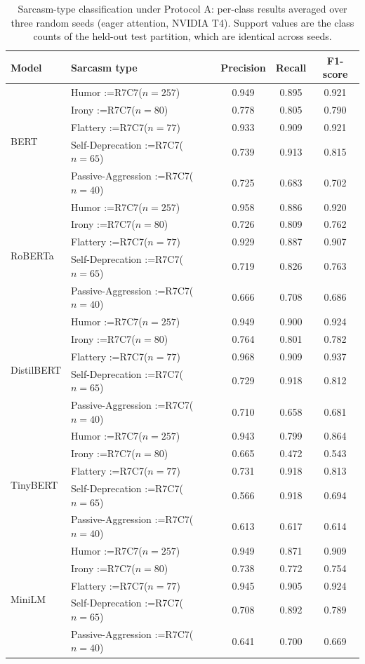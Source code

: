 \documentclass[a4paper,fleqn]{cas-sc}
\makeatletter
\newif\iftracked
\newcommand{\rv@setcolour}[1]{%
  \IfStrEq{#1}{R7C7}{\color{rvEdit}}{%
    \IfSubStr{#1}{R5}{\IfSubStr{#1}{R7}{\color{rvBoth}}{\color{rvFive}}}{\color{rvSeven}}}}
\newcommand{\rv@tag}[1]{\textsuperscript{\sffamily\bfseries\scriptsize[\StrSubstitute{#1}{,}{, }]}\,}
\newcommand{\rv@recordone}[1]{%
  \edef\rv@i{#1}%
  \ifcsdef{rv@n@\rv@i}{}{\csgdef{rv@n@\rv@i}{0}}%
  \csxdef{rv@n@\rv@i}{\the\numexpr\csuse{rv@n@\rv@i}+1\relax}%
  \begingroup\edef\@currentlabel{\rv@i}\label{rv:\rv@i:\csuse{rv@n@\rv@i}}\endgroup}
\newcommand{\rv@record}[1]{\@for\rv@id:=#1\do{\expandafter\rv@recordone\expandafter{\rv@id}}}
\DeclareRobustCommand{\rcx}[2]{\iftracked{\rv@setcolour{#1}\rv@tag{#1}#2}\else#2\fi}
\DeclareRobustCommand{\rce}[1]{\rv@record{R7C7}\iftracked{\color{rvEdit}#1}\else#1\fi}
\makeatother
\begin{document}
\begin{table}[t]
\caption{Sarcasm-type classification\rcx{R5C9,R7C2}{ under Protocol A}: per-class results averaged over three random seeds (\rcx{R7C7}{eager} attention, NVIDIA T4). Support values are the \rcx{R7C7}{class counts of the held-out test partition, which are identical across seeds}.}
\label{tab:type-perclass}
\centering\small
\begin{tabular}{llccc}
\toprule
Model & Sarcasm type & Precision & Recall & F1-score \\
\midrule
\multirow{5}{*}{BERT} & Humor \rce{($n=257$)} & 0.949 & 0.895 & 0.921 \\
 & Irony \rce{($n=80$)} & 0.778 & 0.805 & 0.790 \\
 & Flattery \rce{($n=77$)} & 0.933 & 0.909 & 0.921 \\
 & Self-Deprecation \rce{($n=65$)} & 0.739 & 0.913 & 0.815 \\
 & Passive-Aggression \rce{($n=40$)} & 0.725 & 0.683 & 0.702 \\
\midrule
\multirow{5}{*}{RoBERTa} & Humor \rce{($n=257$)} & 0.958 & 0.886 & 0.920 \\
 & Irony \rce{($n=80$)} & 0.726 & 0.809 & 0.762 \\
 & Flattery \rce{($n=77$)} & 0.929 & 0.887 & 0.907 \\
 & Self-Deprecation \rce{($n=65$)} & 0.719 & 0.826 & 0.763 \\
 & Passive-Aggression \rce{($n=40$)} & 0.666 & 0.708 & 0.686 \\
\midrule
\multirow{5}{*}{DistilBERT} & Humor \rce{($n=257$)} & 0.949 & 0.900 & 0.924 \\
 & Irony \rce{($n=80$)} & 0.764 & 0.801 & 0.782 \\
 & Flattery \rce{($n=77$)} & 0.968 & 0.909 & 0.937 \\
 & Self-Deprecation \rce{($n=65$)} & 0.729 & 0.918 & 0.812 \\
 & Passive-Aggression \rce{($n=40$)} & 0.710 & 0.658 & 0.681 \\
\midrule
\multirow{5}{*}{TinyBERT} & Humor \rce{($n=257$)} & 0.943 & 0.799 & 0.864 \\
 & Irony \rce{($n=80$)} & 0.665 & 0.472 & 0.543 \\
 & Flattery \rce{($n=77$)} & 0.731 & 0.918 & 0.813 \\
 & Self-Deprecation \rce{($n=65$)} & 0.566 & 0.918 & 0.694 \\
 & Passive-Aggression \rce{($n=40$)} & 0.613 & 0.617 & 0.614 \\
\midrule
\multirow{5}{*}{MiniLM} & Humor \rce{($n=257$)} & 0.949 & 0.871 & 0.909 \\
 & Irony \rce{($n=80$)} & 0.738 & 0.772 & 0.754 \\
 & Flattery \rce{($n=77$)} & 0.945 & 0.905 & 0.924 \\
 & Self-Deprecation \rce{($n=65$)} & 0.708 & 0.892 & 0.789 \\
 & Passive-Aggression \rce{($n=40$)} & 0.641 & 0.700 & 0.669 \\
\bottomrule
\end{tabular}
\end{table}
\end{document}

